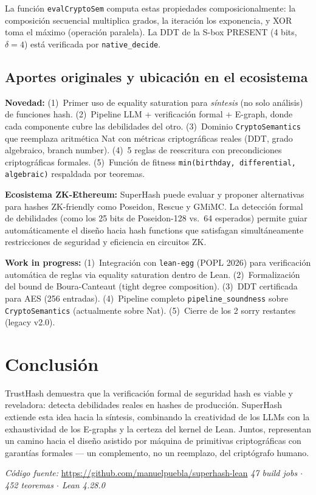 \documentclass[11pt,a4paper]{article}
\begin{document}
\noindent La función \texttt{evalCryptoSem} computa estas propiedades composicionalmente: la composición secuencial multiplica grados, la iteración los exponencia, y XOR toma el máximo (operación paralela). La DDT de la S-box PRESENT (4 bits, $\delta=4$) está verificada por \texttt{native\_decide}.

\subsection{Aportes originales y ubicación en el ecosistema}

\textbf{Novedad:} (1)~Primer uso de equality saturation para \emph{síntesis} (no solo análisis) de funciones hash. (2)~Pipeline LLM + verificación formal + E-graph, donde cada componente cubre las debilidades del otro. (3)~Dominio \texttt{CryptoSemantics} que reemplaza aritmética Nat con métricas criptográficas reales (DDT, grado algebraico, branch number). (4)~5 reglas de reescritura con precondiciones criptográficas formales. (5)~Función de fitness \texttt{min(birthday, differential, algebraic)} respaldada por teoremas.

\textbf{Ecosistema ZK-Ethereum:} SuperHash puede evaluar y proponer alternativas para hashes ZK-friendly como Poseidon, Rescue y GMiMC. La detección formal de debilidades (como los 25 bits de Poseidon-128 vs.\ 64 esperados) permite guiar automáticamente el diseño hacia hash functions que satisfagan simultáneamente restricciones de seguridad y eficiencia en circuitos ZK.

\textbf{Work in progress:} (1)~Integración con \texttt{lean-egg} (POPL 2026) para verificación automática de reglas via equality saturation dentro de Lean. (2)~Formalización del bound de Boura-Canteaut (tight degree composition). (3)~DDT certificada para AES (256 entradas). (4)~Pipeline completo \texttt{pipeline\_soundness} sobre \texttt{CryptoSemantics} (actualmente sobre Nat). (5)~Cierre de los 2 sorry restantes (legacy v2.0).

\section*{Conclusión}

TrustHash demuestra que la verificación formal de seguridad hash es viable y reveladora: detecta debilidades reales en hashes de producción. SuperHash extiende esta idea hacia la síntesis, combinando la creatividad de los LLMs con la exhaustividad de los E-graphs y la certeza del kernel de Lean. Juntos, representan un camino hacia el diseño asistido por máquina de primitivas criptográficas con garantías formales --- un complemento, no un reemplazo, del criptógrafo humano.

\vspace{0.3cm}
\noindent\small\textit{Código fuente:} \url{https://github.com/manuelpuebla/superhash-lean} \hfill \textit{47 build jobs $\cdot$ 452 teoremas $\cdot$ Lean 4.28.0}
\end{document}

